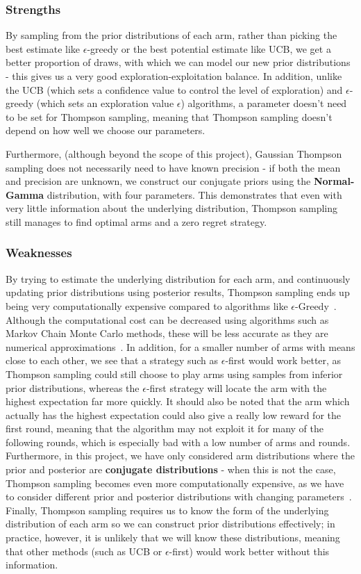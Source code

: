\subsubsection{Strengths}
By sampling from the prior distributions of each arm, rather than picking the best estimate like $\epsilon$-greedy or the best potential estimate like UCB, we get a better proportion of draws, with which we can model our new prior distributions - this gives us a very good exploration-exploitation balance.
In addition, unlike the UCB (which sets a confidence value to control the level of exploration) and $\epsilon$-greedy (which sets an exploration value $\epsilon$) algorithms, a parameter doesn't need to be set for Thompson sampling, meaning that Thompson sampling doesn't depend on how well we choose our parameters.

Furthermore, (although beyond the scope of this project), Gaussian Thompson sampling does not necessarily need to have known precision - if both the mean and precision are unknown, we construct our conjugate priors using the \textbf{Normal-Gamma} distribution, with four parameters.
This demonstrates that even with very little information about the underlying distribution, Thompson sampling still manages to find optimal arms and a zero regret strategy.

\subsubsection{Weaknesses}
By trying to estimate the underlying distribution for each arm, and continuously updating prior distributions using posterior results, Thompson sampling ends up being very computationally expensive compared to algorithms like $\epsilon$-Greedy~\citep{mazumdar2020thompson}.
Although the computational cost can be decreased using algorithms such as Markov Chain Monte Carlo methods, these will be less accurate as they are numerical approximations~\citep{mazumdar2020thompson}.
In addition, for a smaller number of arms with means close to each other, we see that a strategy such as $\epsilon$-first would work better, as Thompson sampling could still choose to play arms using samples from inferior prior distributions, whereas the $\epsilon$-first strategy will locate the arm with the highest expectation far more quickly.
It should also be noted that the arm which actually has the highest expectation could also give a really low reward for the first round, meaning that the algorithm may not exploit it for many of the following rounds, which is especially bad with a low number of arms and rounds.
Furthermore, in this project, we have only considered arm distributions where the prior and posterior are \textbf{conjugate distributions} - when this is not the case, Thompson sampling becomes even more computationally expensive, as we have to consider different prior and posterior distributions with changing parameters~\citep{zhou2018racing}.
Finally, Thompson sampling requires us to know the form of the underlying distribution of each arm so we can construct prior distributions effectively; 
in practice, however, it is unlikely that we will know these distributions, meaning that other methods (such as UCB or $\epsilon$-first) would work better without this information.

